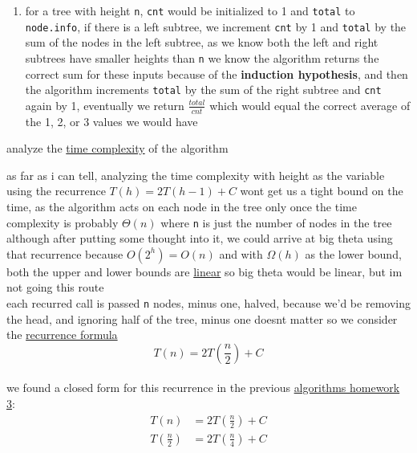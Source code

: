 \documentclass[a4paper,12pt]{article}
\begin{document}
\begin{question}
\begin{subquestion}
\begin{answer}
\begin{enumerate}
\item for a tree with height \texttt{n}, \texttt{cnt} would be initialized to 1 and \texttt{total} to \texttt{node.info}, if there is a left subtree, we increment \texttt{cnt} by 1 and \texttt{total} by the sum of the nodes in the left subtree, as we know both the left and right subtrees have smaller heights than \texttt{n} we know the algorithm returns the correct sum for these inputs because of the \textbf{induction hypothesis}, and then the algorithm increments \texttt{total} by the sum of the right subtree and \texttt{cnt} again by 1, eventually we return \(\frac{total}{cnt}\) which would equal the correct average of the 1, 2, or 3 values we would have\\[0pt]
\end{enumerate}
\end{answer}
\end{subquestion}
\begin{subquestion}
analyze the \href{20221130014441-time_complexity.org}{time complexity} of the algorithm\\[0pt]
\begin{answer}
as far as i can tell, analyzing the time complexity with height as the variable using the recurrence \(T(h)=2T(h-1)+C\) wont get us a tight bound on the time, as the algorithm acts on each node in the tree only once the time complexity is probably \(\Theta(n)\) where \texttt{n} is just the number of nodes in the tree\\[0pt]
although after putting some thought into it, we could arrive at big theta using that recurrence because \(O\left(2^h\right) = O(n)\) and with \(\Omega(h)\) as the lower bound, both the upper and lower bounds are \href{2022-12-14T13_06_19.949Z.Desktop.org}{linear} so big theta would be linear, but im not going this route\\[0pt]
each recurred call is passed \texttt{n} nodes, minus one, halved, because we'd be removing the head, and ignoring half of the tree, minus one doesnt matter so we consider the \href{2022-12-14T13_06_16.539Z.Desktop.org}{recurrence formula}\\[0pt]
\[
T(n)=2T\left(\frac{n}{2}\right)+C
\]\\[0pt]
we found a closed form for this recurrence in the previous \href{2022-12-14T16_14_04.162Z.Desktop.org}{algorithms homework 3}:\\[0pt]
\begin{align*}
  T(n) &= 2T\left(\frac{n}{2}\right) + C\\
  T\left(\frac{n}{2}\right) &= 2T\left(\frac{n}{4}\right) + C\\

\end{align*}
\end{answer}
\end{subquestion}
\end{question}
\end{document}
